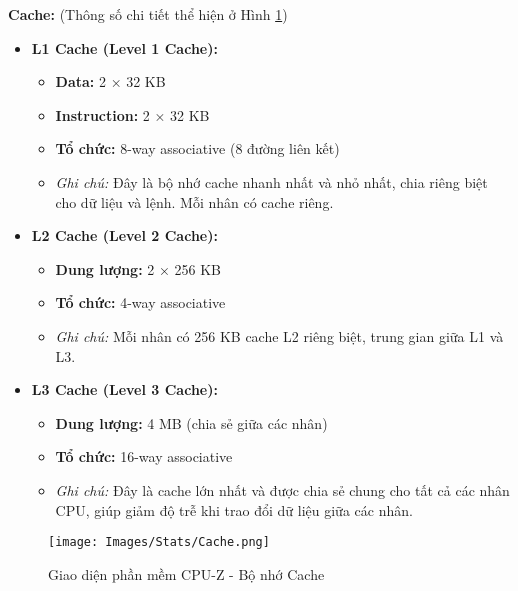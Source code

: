 \noindent\textbf{\large Cache:} (Thông số chi tiết thể hiện ở Hình \ref{fig:cpu-z-cache})

\begin{itemize}
    \item \textbf{L1 Cache (Level 1 Cache):}
    \begin{itemize}
        \item \textbf{Data:} 2 × 32 KB
        \item \textbf{Instruction:} 2 × 32 KB
        \item \textbf{Tổ chức:} 8-way associative (8 đường liên kết)
        \item \textit{Ghi chú:} Đây là bộ nhớ cache nhanh nhất và nhỏ nhất, chia riêng biệt cho dữ liệu và lệnh. Mỗi nhân có cache riêng.
    \end{itemize}
    
    \item \textbf{L2 Cache (Level 2 Cache):}
    \begin{itemize}
        \item \textbf{Dung lượng:} 2 × 256 KB
        \item \textbf{Tổ chức:} 4-way associative
        \item \textit{Ghi chú:} Mỗi nhân có 256 KB cache L2 riêng biệt, trung gian giữa L1 và L3.
    \end{itemize}
    
    \item \textbf{L3 Cache (Level 3 Cache):}
    \begin{itemize}
        \item \textbf{Dung lượng:} 4 MB (chia sẻ giữa các nhân)
        \item \textbf{Tổ chức:} 16-way associative
        \item \textit{Ghi chú:} Đây là cache lớn nhất và được chia sẻ chung cho tất cả các nhân CPU, giúp giảm độ trễ khi trao đổi dữ liệu giữa các nhân.
    \end{itemize}
\end{itemize}

\begin{center}
\end{center}

\begin{figure}[H]
    \centering
    \texttt{[image: Images/Stats/Cache.png]}
    \caption{Giao diện phần mềm CPU-Z - Bộ nhớ Cache}
    \label{fig:cpu-z-cache}
\end{figure}

